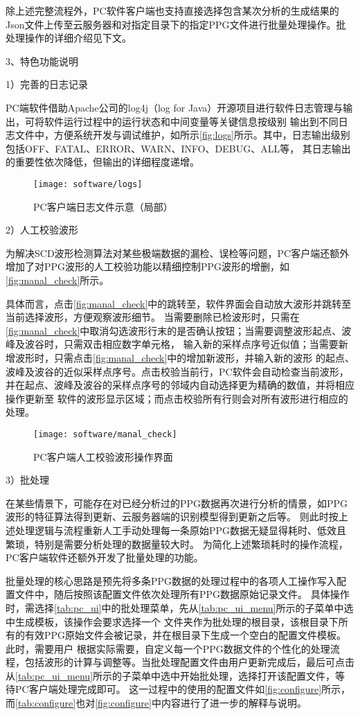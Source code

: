 除上述完整流程外，PC软件客户端也支持直接选择包含某次分析的生成结果的Json文件上传至云服务器和对指定目录下的指定PPG文件进行批量处理操作。批处理操作的详细介绍见下文。

3、特色功能说明

1）完善的日志记录

PC端软件借助Apache公司的log4j（log for Java）开源项目进行软件日志管理与输出，可将软件运行过程中的运行状态和中间变量等关键信息按级别
输出到不同日志文件中，方便系统开发与调试维护，如所示\autoref{fig:logs}所示。其中，日志输出级别包括OFF、FATAL、ERROR、WARN、INFO、DEBUG、ALL等，
其日志输出的重要性依次降低，但输出的详细程度递增。
\begin{figure}[htbp]
    \centering
    \texttt{[image: software/logs]}
    \caption{\label{fig:logs}PC客户端日志文件示意（局部）}
\end{figure}

2）人工校验波形

为解决SCD波形检测算法对某些极端数据的漏检、误检等问题，PC客户端还额外增加了对PPG波形的人工校验功能以精细控制PPG波形的增删，如\autoref{fig:manal_check}所示。

具体而言，点击\autoref{fig:manal_check}中的跳转至，软件界面会自动放大波形并跳转至当前选择波形，方便观察波形细节。
当需要删除已检波形时，只需在\autoref{fig:manal_check}中取消勾选波形行末的是否确认按钮；当需要调整波形起点、波峰及波谷时，只需双击相应数字单元格，
输入新的采样点序号近似值；当需要新增波形时，只需点击\autoref{fig:manal_check}中的增加新波形，并输入新的波形
的起点、波峰及波谷的近似采样点序号。点击校验当前行，PC软件会自动检查当前波形，并在起点、波峰及波谷的采样点序号的邻域内自动选择更为精确的数值，并将相应操作更新至
软件的波形显示区域；而点击校验所有行则会对所有波形进行相应的处理。
\begin{figure}[htbp]
    \centering
    \texttt{[image: software/manal\_check]}
    \caption{\label{fig:manal_check}PC客户端人工校验波形操作界面}
\end{figure}

3）批处理

在某些情景下，可能存在对已经分析过的PPG数据再次进行分析的情景，如PPG波形的特征算法得到更新、云服务器端的识别模型得到更新之后等。
则此时按上述处理逻辑与流程重新人工手动处理每一条原始PPG数据无疑显得耗时、低效且繁琐，特别是需要分析处理的数据量较大时。
为简化上述繁琐耗时的操作流程，PC客户端软件还额外开发了批量处理的功能。

批量处理的核心思路是预先将多条PPG数据的处理过程中的各项人工操作写入配置文件中，随后按照该配置文件依次处理所有PPG数据原始记录文件。
具体操作时，需选择\autoref{tab:pc_ui}中的批处理菜单，先从\autoref{tab:pc_ui_menu}所示的子菜单中选中生成模板，该操作会要求选择一个
文件夹作为批处理的根目录，该根目录下所有的有效PPG原始文件会被记录，并在根目录下生成一个空白的配置文件模板。此时，需要用户
根据实际需要，自定义每一个PPG数据文件的个性化的处理流程，包括波形的计算与调整等。当批处理配置文件由用户更新完成后，最后可点击
从\autoref{tab:pc_ui_menu}所示的子菜单中选中开始批处理，选择打开该配置文件，等待PC客户端处理完成即可。
这一过程中的使用的配置文件如\autoref{fig:configure}所示，而\autoref{tab:configure}也对\autoref{fig:configure}中内容进行了进一步的解释与说明。

